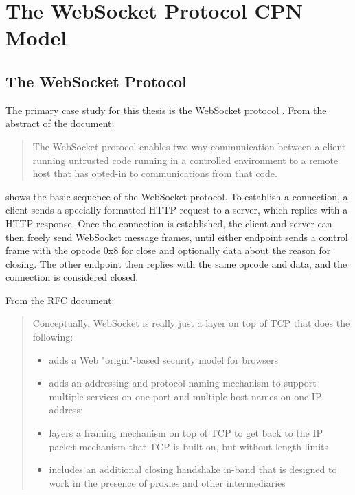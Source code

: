 \chapter{The WebSocket Protocol CPN Model}
\label{chap:background}

\section{The WebSocket Protocol}
The primary case study for this thesis is the WebSocket protocol 
\cite{draft-ietf-hybi-thewebsocketprotocol}. From the abstract of the document:
\begin{quote}The WebSocket protocol enables two-way communication between a
client running untrusted code running in a controlled environment to a
remote host that has opted-in to communications from that code.
\end{quote}


 shows the basic sequence of the WebSocket protocol. To
establish a connection, a client sends a specially formatted HTTP request to a
server, which replies with a HTTP response. Once the connection is
established, the client and server can then freely send WebSocket message
frames, until either endpoint sends a control frame with the opcode 0x8 for
close and optionally data about the reason for closing. The other endpoint then
replies with the same opcode and data, and the connection is considered closed.

From the RFC document:

\begin{quote}
	Conceptually, WebSocket is really just a layer on top of TCP that
	does the following:
	\begin{itemize}
		\item adds a Web "origin"-based security model for browsers
	
		\item adds an addressing and protocol naming mechanism to support
		multiple services on one port and multiple host names on one IP
		address;
	
		\item layers a framing mechanism on top of TCP to get back to the IP
		packet mechanism that TCP is built on, but without length limits
	
		\item includes an additional closing handshake in-band that is designed
		to work in the presence of proxies and other intermediaries
	\end{itemize}
\end{quote}

